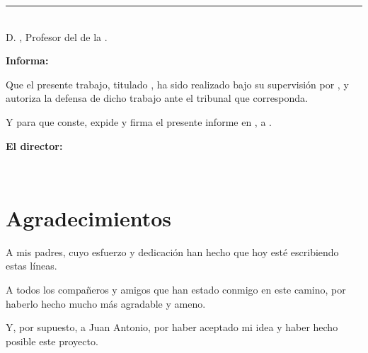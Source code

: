 \noindent\rule[-1ex]{\textwidth}{2pt}\\[4.5ex]

D. \textbf{\myProf}, Profesor del \textbf{\myDepartment} de la \textbf{\myUni}.

\vspace{0.5cm}

\textbf{Informa:}

\vspace{0.5cm}

Que el presente trabajo, titulado \textit{\textbf{\myTitle}}, ha sido realizado bajo su supervisión 
por \textbf{\myName}, y autoriza la defensa de dicho trabajo ante el tribunal que corresponda.

\vspace{0.5cm}

Y para que conste, expide y firma el presente informe en \myLocation, a \myTimeES.

\vspace{1cm}

\textbf{El director:}

\vspace{5cm}

\noindent \textbf{\myProf\\}

\chapter*{Agradecimientos}
\thispagestyle{empty}

\vspace{1cm}

\hspace{4ex}A mis padres, cuyo esfuerzo y dedicación han hecho que hoy esté escribiendo estas líneas.

\bigskip
A todos los compañeros y amigos que han estado conmigo en este camino, por haberlo hecho 
mucho más agradable y ameno.

\bigskip
Y, por supuesto, a Juan Antonio, por haber aceptado mi idea y haber hecho posible este proyecto.
